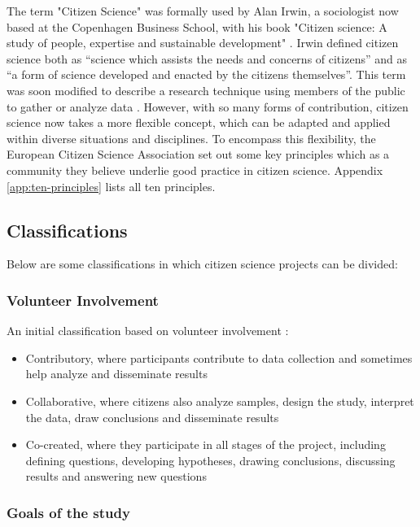 The term "Citizen Science" was formally used by Alan Irwin, a sociologist now based at the Copenhagen Business School, with his book "Citizen science: A study of people, expertise and sustainable development" \cite{irwin1995citizen}. Irwin defined citizen science both as “science which assists the needs and concerns of citizens” and as “a form of science developed and enacted by the citizens themselves”. This term was soon modified to describe a research technique using members of the public to gather or analyze data \cite{bonney2009citizen}. However, with so many forms of contribution, citizen science now takes a more flexible concept, which can be adapted and applied within diverse situations and disciplines. To encompass this flexibility, the European Citizen Science Association \cite{robinson2018ten} set out some key principles which as a community they believe underlie good practice in citizen science. Appendix \ref{app:ten-principles} lists all ten principles.

\subsection{Classifications}

Below are some classifications in which citizen science projects can be divided:

\subsubsection{Volunteer Involvement}

An initial classification based on volunteer involvement \cite{follett2015analysis}: 
\begin{itemize}
    \item Contributory, where participants contribute to data collection and sometimes help analyze and disseminate results
    \item Collaborative, where citizens also analyze samples, design the study, interpret the data, draw conclusions and disseminate results
    \item Co-created, where they participate in all stages of the project, including defining questions, developing hypotheses, drawing conclusions, discussing results and answering new questions
\end{itemize}

\subsubsection{Goals of the study}

